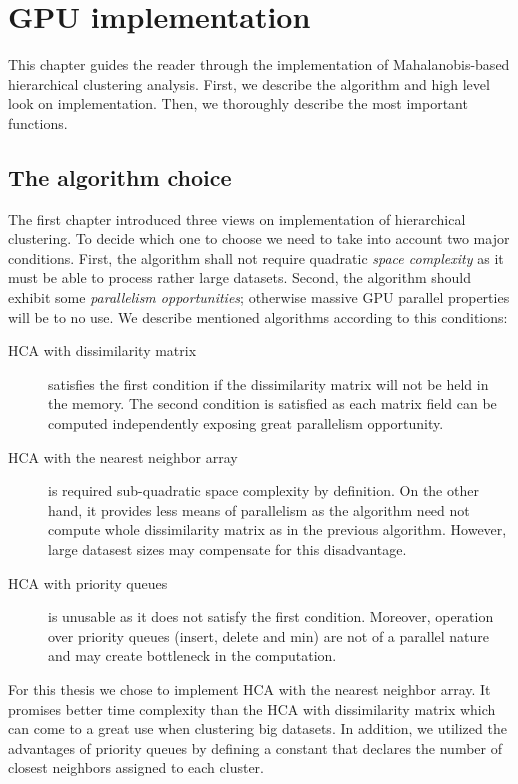 \chapter{GPU implementation}

This chapter guides the reader through the implementation of Mahalanobis-based hierarchical clustering analysis. First, we describe the algorithm and high level look on implementation. Then, we thoroughly describe the most important functions.

\section{The algorithm choice}

The first chapter introduced three views on implementation of hierarchical clustering. To decide which one to choose we need to take into account two major conditions. First, the algorithm shall not require quadratic \emph{space complexity} as it must be able to process rather large datasets. Second, the algorithm should exhibit some \emph{parallelism opportunities}; otherwise massive GPU parallel properties will be to no use.  We describe mentioned algorithms according to this conditions:
\begin{description}

\item[HCA with dissimilarity matrix] satisfies the first condition if the dissimilarity matrix will not be held in the memory. The second condition is satisfied as each matrix field can be computed independently exposing great parallelism opportunity. 

\item[HCA with the nearest neighbor array] is required sub-quadratic space complexity by definition. On the other hand, it provides less means of parallelism as the algorithm need not compute whole dissimilarity matrix as in the previous algorithm. However, large datasest sizes may compensate for this disadvantage. 

\item[HCA with priority queues] is unusable as it does not satisfy the first condition. Moreover, operation over priority queues (insert, delete and min) are not of a parallel nature and may create bottleneck in the computation.

\end{description}

For this thesis we chose to implement HCA with the nearest neighbor array. It promises better time complexity than the HCA with dissimilarity matrix which can come to a great use when clustering big datasets. In addition, we utilized the advantages of priority queues by defining a constant that declares the number of closest neighbors assigned to each cluster.

